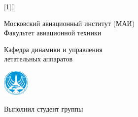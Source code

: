 
[1][]
{
\vspace{-1.25cm}
\begin{center}
\begin{minipage}{\textwidth}
\begin{center}
    Московский авиационный институт (МАИ)\\
    Факультет авиационной техники\\
\end{center}
\end{minipage}
\begin{minipage}{0.05\textwidth}
    \resizebox{1.3cm}{!}{}
\end{minipage}
\hfill
\begin{minipage}{0.85\textwidth}
    \begin{center}
        \small{Кафедра динамики и управления\\летательных аппаратов}
    \end{center}
\end{minipage}
\begin{minipage}{0.05\textwidth}
    \includegraphics[height=1.3cm]{./figures/fac_logo.jpg}
\end{minipage}
\vfill
\inserttitle\par
\vfill
\hfill \small{Выполнил студент группы \insertinstitute}\par
\hfill \small{\insertauthor}\par
\insertdate\par
{}\inserttitlegraphic
\end{center}
}


